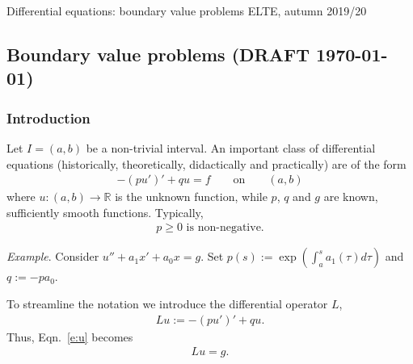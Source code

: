 \documentclass[12pt,a4paper]{article}
\newcommand{\from}{\colon}
\newcommand{\IR}{\mathbb{R}}
\begin{document}
    
    Differential equations: boundary value problems
    \hfill
    ELTE, autumn 2019/20
    
    \subsection*{Boundary value problems (DRAFT \today)}
    
    \subsubsection*{Introduction}
    
    
    Let $I = (a, b)$ be a non-trivial interval.
    An important class of differential equations
    (historically, theoretically, didactically and practically)
    are
    of the form
    \begin{align}
        \label{e:u}
        -(p u')' + q u = f
        \qquad\text{on}\qquad
        (a, b)
    \end{align}
    where 
    $u \from (a, b) \to \IR$
    is the unknown function,
    while $p$, $q$ and $g$ are known, sufficiently smooth functions.
    Typically, 
    \begin{align}
        \label{e:p0}
        \text{$p \geq 0$ is non-negative.}
    \end{align}

    
    \emph{Example}.
    Consider $u'' + a_1 x' + a_0 x = g$.
    Set $p(s) := \exp(\int_a^s a_1(\tau) d\tau)$
    and $q := -p a_0$.
    
    
    
    To streamline the notation we introduce 
    the differential operator $L$,
    \begin{align}
        \label{e:L}
        L u :=
        -(p u')' + q u
        .
    \end{align}
    Thus, Eqn.~\ref{e:u} becomes
    \begin{align}
        \label{e:Lu}
        L u = g
        .
    \end{align}

    
    
\end{document}
